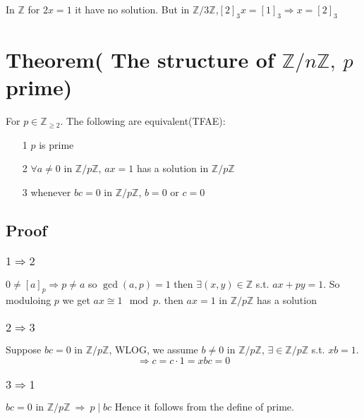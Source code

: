 \documentclass{book}
\begin{document}
In $\mathbb{Z}$ for $2x=1$ it have no solution. But in $\mathbb{Z}/3\mathbb{Z}$,$[2]_3x=[1]_3\Rightarrow x=[2]_3$
\section{Theorem( The structure of $\mathbb{Z}/n\mathbb{Z},\ p$ prime)}
For $p\in \mathbb{Z}_{\geq2}$. The following are equivalent(TFAE):
\begin{itemize}
	\item[1] $p$ is prime
	\item[2] $\forall  a\neq 0$ in $\mathbb{Z}/p\mathbb{Z}$, $ax=1$ has a solution in $\mathbb{Z}/p\mathbb{Z}$
	\item[3] whenever $bc=0$ in $\mathbb{Z}/p\mathbb{Z}$, $b=0$ or $c=0$
\end{itemize} 
\subsection*{Proof}
\subsubsection{$1\Rightarrow 2$}
$0\neq [a]_p\Rightarrow p\neq a$ so $\gcd(a,p)=1$ then $\exists(x,y)\in \mathbb{Z}$ s.t. $ax+py=1$. So moduloing $p$ we get $ax\cong 1\mod p$. then $ax=1$ in $\mathbb{Z}/p\mathbb{Z}$ has a solution
\subsubsection{$2\Rightarrow 3$}
Suppose $bc=0$ in $\mathbb{Z}/p\mathbb{Z}$, WLOG, we assume $b\neq 0$ in $\mathbb{Z}/p\mathbb{Z}$, $\exists\in \mathbb{Z}/p\mathbb{Z}$ s.t. $xb=1$. $$\Rightarrow c=c\cdot 1=xbc=0$$
\subsubsection{$3\Rightarrow 1$}
$bc=0$ in $\mathbb{Z}/p\mathbb{Z}\ \Rightarrow\ p\mid bc$ Hence it follows from the define of prime.
\end{document}
